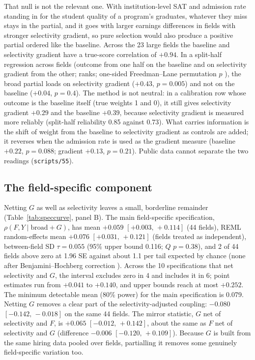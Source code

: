 \documentclass[11pt]{article}
\newcommand{\ci}[2]{$[#1,\allowbreak\,#2]$}
\newcommand{\scr}[1]{\texttt{scripts/#1}}
\begin{document}
That null is not the relevant one. With institution-level SAT and admission rate standing in for the student
quality of a program's graduates, whatever they miss stays in the partial, and it goes with larger earnings
differences in fields with stronger selectivity gradient, so pure selection would also produce a positive partial
ordered like the baseline. Across the 23 large
fields the baseline and selectivity gradient have a true-score correlation of $+0.94$. In a split-half regression
across fields (outcome from one half on the baseline and on selectivity gradient from the other; ranks;
one-sided Freedman--Lane permutation $p$ \citep{freedman1983nonstochastic}), the broad partial loads on selectivity gradient ($+0.43$, $p=0.005$)
and not on the baseline ($+0.04$, $p=0.4$). The method is not neutral: in a calibration row whose outcome is the
baseline itself (true weights 1 and 0), it still gives selectivity gradient $+0.29$ and the baseline $+0.39$,
because selectivity gradient is measured more reliably (split-half reliability 0.85 against 0.73). What carries
information is the shift of weight from the baseline to selectivity gradient as controls are added; it reverses
when the admission rate is used as the gradient measure (baseline $+0.22$, $p=0.088$; gradient $+0.13$, $p=0.21$).
Public data cannot separate the two readings (\scr{55}).

\subsection{The field-specific component}\label{sec:fieldspecific}

Netting $G$ as well as selectivity leaves a small, borderline remainder (Table~\ref{tab:speccurve}, panel B). The
main field-specific specification, $\rho(F,Y\mid\text{broad}+G)$, has mean $+0.059$ \ci{+0.003}{+0.114} (44
fields), REML random-effects mean $+0.076$ \ci{+0.031}{+0.121} (fields treated as independent), between-field SD
$\tau=0.055$ (95\% upper bound 0.116; $Q$ $p=0.38$), and 2 of 44 fields above zero at 1.96 SE against about 1.1
per tail expected by chance (none after Benjamini--Hochberg correction \citep{benjamini1995controlling}). Across the 10 specifications that net
selectivity and $G$, the interval excludes zero in 4 and includes it in 6; point estimates run from $+0.041$ to
$+0.140$, and upper bounds reach at most $+0.252$. The minimum detectable mean (80\% power) for the main specification is
0.079. Netting $G$ removes a clear part of the selectivity-adjusted coupling: $-0.080$ \ci{-0.142}{-0.018} on the
same 44 fields. The mirror statistic, $G$ net of selectivity and $F$, is $+0.065$ \ci{-0.012}{+0.142}, about the
same as $F$ net of selectivity and $G$ (difference $-0.006$ \ci{-0.120}{+0.109}). Because $G$ is built from the same
hiring data pooled over fields, partialling it removes some genuinely field-specific variation too.
\end{document}
